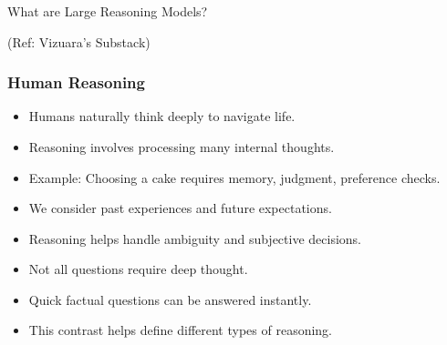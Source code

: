 \begin{frame}[fragile]\frametitle{}
\begin{center}
{\Large What are Large Reasoning Models?}

{\tiny (Ref: Vizuara's Substack)}

\end{center}


\end{frame}

\begin{frame}[fragile]\frametitle{Human Reasoning}
\begin{itemize}
  \item Humans naturally think deeply to navigate life.
  \item Reasoning involves processing many internal thoughts.
  \item Example: Choosing a cake requires memory, judgment, preference checks.
  \item We consider past experiences and future expectations.
  \item Reasoning helps handle ambiguity and subjective decisions.
  \item Not all questions require deep thought.
  \item Quick factual questions can be answered instantly.
  \item This contrast helps define different types of reasoning.
\end{itemize}
\end{frame}

